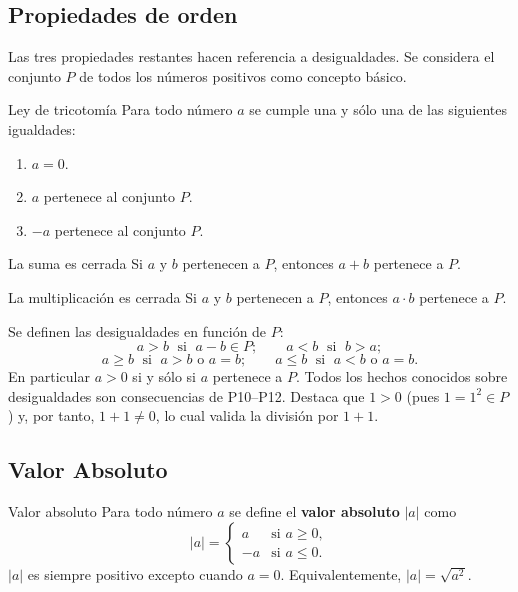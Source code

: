\documentclass[12pt]{article}
\begin{document}
\subsection{Propiedades de orden}

Las tres propiedades restantes hacen referencia a desigualdades. Se considera el conjunto $P$ de todos los números positivos como concepto básico.

\begin{axioma}[P10]{Ley de tricotomía}
Para todo número $a$ se cumple una y sólo una de las siguientes igualdades:
\begin{enumerate}
  \item[(i)] $a = 0$.
  \item[(ii)] $a$ pertenece al conjunto $P$.
  \item[(iii)] $-a$ pertenece al conjunto $P$.
\end{enumerate}
\end{axioma}

\begin{axioma}[P11]{La suma es cerrada}
Si $a$ y $b$ pertenecen a $P$, entonces $a + b$ pertenece a $P$.
\end{axioma}

\begin{axioma}[P12]{La multiplicación es cerrada}
Si $a$ y $b$ pertenecen a $P$, entonces $a \cdot b$ pertenece a $P$.
\end{axioma}

\begin{nota}[]{}
Se definen las desigualdades en función de $P$:
\[ a > b \;\text{ si }\; a - b \in P; \qquad a < b \;\text{ si }\; b > a; \]
\[ a \geq b \;\text{ si }\; a > b \text{ o } a = b; \qquad a \leq b \;\text{ si }\; a < b \text{ o } a = b. \]
En particular $a > 0$ si y sólo si $a$ pertenece a $P$. Todos los hechos conocidos sobre desigualdades son consecuencias de P10--P12. Destaca que $1 > 0$ (pues $1 = 1^2 \in P$) y, por tanto, $1 + 1 \neq 0$, lo cual valida la división por $1 + 1$.
\end{nota}

\subsection{Valor Absoluto}

\begin{definicion}[]{Valor absoluto}
Para todo número $a$ se define el \textbf{valor absoluto} $|a|$ como
\[ |a| = \begin{cases} a & \text{si } a \geq 0, \\ -a & \text{si } a \leq 0. \end{cases} \]
$|a|$ es siempre positivo excepto cuando $a = 0$. Equivalentemente, $|a| = \sqrt{a^2}$.
\end{definicion}
\end{document}
